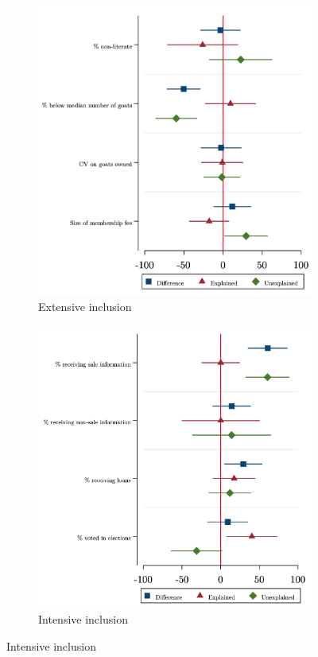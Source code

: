 \documentclass[11pt]{article}
\begin{document}
\begin{figure}[H]
\caption{Decomposition results for revenue from cooperative goat sales}
    \centering
    \begin{subfigure}[t]{.49\textwidth}
    \centering
        \caption{Extensive inclusion} \label{figure:E2_PD_Annual}
        \includegraphics[width=\linewidth,trim=4 4 4 4,clip]{decomp_1_ex.png} 
    \end{subfigure}
    \vspace{.1cm}
    \begin{subfigure}[t]{0.49\textwidth}
        \centering
        \caption{Intensive inclusion} \label{figure:E2_PD_Festival}
        \includegraphics[width=\linewidth,trim=4 4 4 4,clip]{decomp_1_in.png} 

\end{subfigure}
\end{figure}
\end{document}
